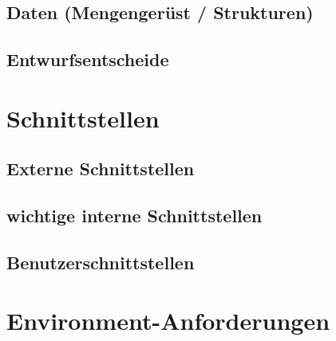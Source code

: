 \documentclass[11pt,a4paper]{scrreprt}
\begin{document}
\section{Daten (Mengengerüst / Strukturen)}

\section{Entwurfsentscheide} 

\chapter{Schnittstellen}

\section{Externe Schnittstellen}

\section{wichtige interne Schnittstellen}

\section{Benutzerschnittstellen} 

\chapter{Environment-Anforderungen}
\end{document}
